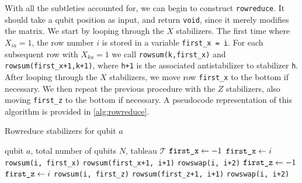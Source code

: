 With all the subtleties accounted for, we can begin to construct
\verb|rowreduce|. It should take a qubit position as input, and return
\verb|void|, since it merely modifies the matrix. We start by looping through
the $X$ stabilizers. The first time where $X_{ia}=1$, the row number $i$ is
stored in a variable \verb|first_x = i|. For each subsequent row with $X_{ka}=1$
we call \verb|rowsum(k,first_x)| and \verb|rowsum(first_x+1,k+1)|, where
\verb|h+1| is the associated antistabilizer to stabilizer \verb|h|. After
looping through the $X$ stabilizers, we move row \verb|first_x| to the bottom
if necessary. We then repeat the previous procedure with the $Z$ stabilizers,
also moving \verb|first_z| to the bottom if necessary. A pseudocode
representation of this algorithm is provided in \cref{alg:rowreduce}.

\begin{algorithm}[H]
\caption{Rowreduce stabilizers for qubit $a$}
\label{alg:rowreduce}
\begin{algorithmic}[1]
\REQUIRE qubit $a$, total number of qubits $N$, tableau $\mathcal{T}$
\STATE $\verb|first_x| \leftarrow -1$
    \STATE $\verb|first_x| \leftarrow i$
    \STATE \verb|rowsum(i, first_x)|
    \STATE \verb|rowsum(first_x+1, i+1)|
  \ENDIF
\ENDFOR
{}
    \STATE \verb|rowswap(i, i+2)|
  \ENDFOR
\ENDIF
\STATE $\verb|first_z| \leftarrow -1$
    \STATE $\verb|first_z| \leftarrow i$
    \STATE \verb|rowsum(i, first_z)|
    \STATE \verb|rowsum(first_z+1, i+1)|
  \ENDIF
\ENDFOR
{}
    \STATE \verb|rowswap(i, i+2)|
  \ENDFOR
\ENDIF
\end{algorithmic}
\end{algorithm}

